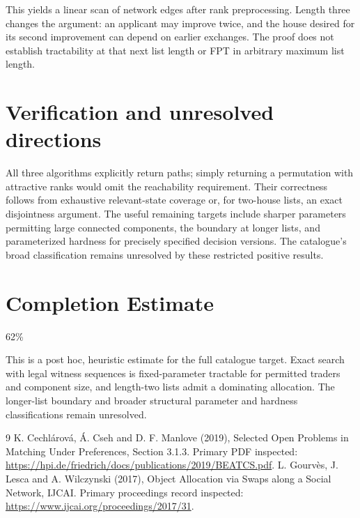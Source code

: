 \documentclass[11pt]{article}
\begin{document}
This yields a linear scan of network edges after rank preprocessing. Length three changes the argument: an applicant may improve twice, and the house desired for its second improvement can depend on earlier exchanges. The proof does not establish tractability at that next list length or FPT in arbitrary maximum list length.

\section*{Verification and unresolved directions}
All three algorithms explicitly return paths; simply returning a permutation with attractive ranks would omit the reachability requirement. Their correctness follows from exhaustive relevant-state coverage or, for two-house lists, an exact disjointness argument. The useful remaining targets include sharper parameters permitting large connected components, the boundary at longer lists, and parameterized hardness for precisely specified decision versions. The catalogue's broad classification remains unresolved by these restricted positive results.

\section{Completion Estimate}
62\%

This is a post hoc, heuristic estimate for the full catalogue target.
Exact search with legal witness sequences is fixed-parameter tractable for permitted traders and component size, and length-two lists admit a dominating allocation. The longer-list boundary and broader structural parameter and hardness classifications remain unresolved.

\begin{thebibliography}{9}
 K. Cechl\'arov\'a, \'A. Cseh and D. F. Manlove (2019), Selected Open Problems in Matching Under Preferences, Section 3.1.3. Primary PDF inspected:
\url{https://hpi.de/friedrich/docs/publications/2019/BEATCS.pdf}.
 L. Gourv\`es, J. Lesca and A. Wilczynski (2017), Object Allocation via Swaps along a Social Network, IJCAI. Primary proceedings record inspected:
\url{https://www.ijcai.org/proceedings/2017/31}.
\end{thebibliography}
\end{document}
